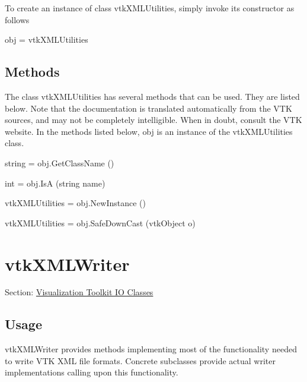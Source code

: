 To create an instance of class vtk\-X\-M\-L\-Utilities, simply invoke its constructor as follows \begin{DoxyVerb}  obj = vtkXMLUtilities
\end{DoxyVerb}
 \hypertarget{vtkwidgets_vtkxyplotwidget_Methods}{}\subsection{Methods}\label{vtkwidgets_vtkxyplotwidget_Methods}
The class vtk\-X\-M\-L\-Utilities has several methods that can be used. They are listed below. Note that the documentation is translated automatically from the V\-T\-K sources, and may not be completely intelligible. When in doubt, consult the V\-T\-K website. In the methods listed below, {\ttfamily obj} is an instance of the vtk\-X\-M\-L\-Utilities class. 
\begin{DoxyItemize}
\item {\ttfamily string = obj.\-Get\-Class\-Name ()}  
\item {\ttfamily int = obj.\-Is\-A (string name)}  
\item {\ttfamily vtk\-X\-M\-L\-Utilities = obj.\-New\-Instance ()}  
\item {\ttfamily vtk\-X\-M\-L\-Utilities = obj.\-Safe\-Down\-Cast (vtk\-Object o)}  
\end{DoxyItemize}\hypertarget{vtkio_vtkxmlwriter}{}\section{vtk\-X\-M\-L\-Writer}\label{vtkio_vtkxmlwriter}
Section\-: \hyperlink{sec_vtkio}{Visualization Toolkit I\-O Classes} \hypertarget{vtkwidgets_vtkxyplotwidget_Usage}{}\subsection{Usage}\label{vtkwidgets_vtkxyplotwidget_Usage}
vtk\-X\-M\-L\-Writer provides methods implementing most of the functionality needed to write V\-T\-K X\-M\-L file formats. Concrete subclasses provide actual writer implementations calling upon this functionality.

